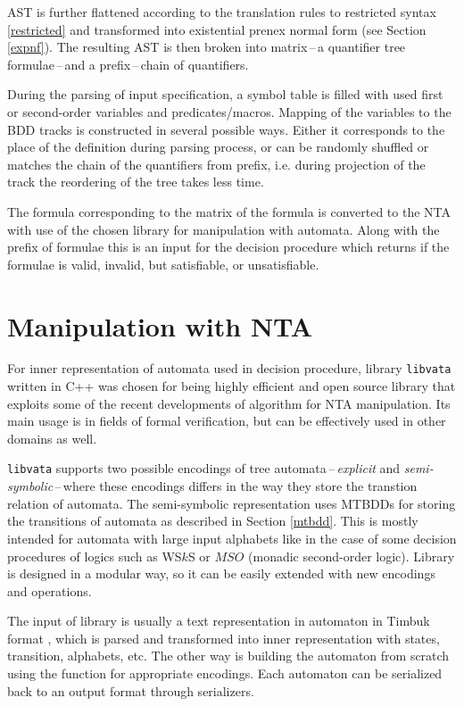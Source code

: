 AST is further flattened according to the translation rules to restricted syntax
\ref{restricted} and transformed into existential prenex normal form (see
Section \ref{expnf}). The resulting AST is then broken into matrix\,--\,a
quantifier tree formulae\,--\,and a prefix\,--\,chain of quantifiers. 

During the parsing of input specification, a symbol table is filled with used
first or second-order variables and predicates/macros. Mapping of the variables
to the BDD tracks is constructed in several possible ways. Either it corresponds
to the place of the definition during parsing process, or can be randomly
shuffled or matches the chain of the quantifiers from prefix, i.e. during
projection of the track the reordering of the tree takes less time.

The formula corresponding to the matrix of the formula is converted to the NTA
with use of the chosen library for manipulation with automata. Along with the
prefix of formulae this is an input for the decision procedure which returns
if the formulae is valid, invalid, but satisfiable, or unsatisfiable.

\section{Manipulation with NTA}

For inner representation of automata used in decision procedure, library
\texttt{libvata} \cite{vata-tool} written in C++ was chosen for being highly
efficient and open source library that exploits some of the recent developments
of algorithm for NTA manipulation. Its main usage is in fields of formal
verification, but can be effectively used in other domains as well.

\texttt{libvata} supports two possible encodings of tree
automata\,--\,\emph{explicit} and \emph{semi-symbolic}\,--\,where these
encodings differs in the way they store the transtion relation of automata. The
semi-symbolic representation uses MTBDDs for storing the transitions of automata
as described in Section \ref{mtbdd}. This is mostly intended for automata with
large input alphabets like in the case of some decision procedures of logics
such as WS$k$S or $MSO$ (monadic second-order logic). Library is designed in a
modular way, so it can be easily extended with new encodings and operations.

The input of library is usually a text representation in automaton in Timbuk
format \cite{timbuk}, which is parsed and transformed into inner representation
with states, transition, alphabets, etc. The other way is building the automaton
from scratch using the function for appropriate encodings. Each automaton can be
serialized back to an output format through serializers.


